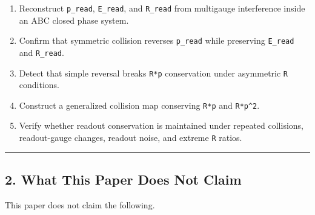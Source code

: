 \documentclass[
  a4paper,
]{article}
\providecommand{\tightlist}{%
  \setlength{\itemsep}{0pt}\setlength{\parskip}{0pt}}
\begin{document}
\begin{enumerate}
\def\labelenumi{\arabic{enumi}.}
\tightlist
\item
  Reconstruct \texttt{p\_read}, \texttt{E\_read}, and \texttt{R\_read}
  from multigauge interference inside an ABC closed phase system.
\item
  Confirm that symmetric collision reverses \texttt{p\_read} while
  preserving \texttt{E\_read} and \texttt{R\_read}.
\item
  Detect that simple reversal breaks \texttt{R*p} conservation under
  asymmetric \texttt{R} conditions.
\item
  Construct a generalized collision map conserving \texttt{R*p} and
  \texttt{R*p\^{}2}.
\item
  Verify whether readout conservation is maintained under repeated
  collisions, readout-gauge changes, readout noise, and extreme
  \texttt{R} ratios.
\end{enumerate}

\begin{center}\rule{0.5\linewidth}{0.5pt}\end{center}

\subsection{2. What This Paper Does Not
Claim}\label{what-this-paper-does-not-claim}

This paper does not claim the following.
\end{document}
